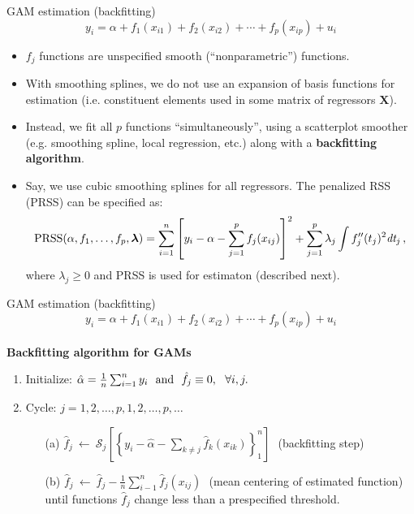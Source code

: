\documentclass{beamer}
\begin{document}
\begin{frame}{GAM estimation (backfitting)}
\vspace{-0.3cm}
$$ y_i = \alpha + f_1(x_{i1}) + f_2(x_{i2}) + \cdots + f_p(x_{ip}) + u_i$$
\vspace{-0.3cm}
\begin{itemize}
    \item $f_j$ functions are unspecified smooth (``nonparametric'') functions.
    \smallskip
    \item With smoothing splines, we do not use an expansion of basis functions for estimation (i.e. constituent elements used in some matrix of regressors $\bm{X}$).
    \smallskip
    \item Instead, we fit all $p$ functions ``simultaneously'', using a scatterplot smoother (e.g. smoothing spline, local regression, etc.) along with a \textbf{backfitting algorithm}.
    \smallskip
    \item Say, we use cubic smoothing splines for all regressors. The penalized RSS (PRSS) can be specified as:
    \small{$$\textnormal{PRSS}(\alpha,f_1,\dots,f_p,\bm{\lambda}) = \sum_{i=1}^n \left[y_i - \alpha - \sum_{j=1}^p f_j(x_{ij}) \right]^2 + \sum_{j=1}^p \lambda_j \int f_j''(t_j)^2 \textit{dt}_j\,,$$}
    where $\lambda_j \geq 0$ and PRSS is used for estimaton (described next).
\end{itemize}
\end{frame}
\begin{frame}{GAM estimation (backfitting)}
\vspace{-0.3cm}
$$ y_i = \alpha + f_1(x_{i1}) + f_2(x_{i2}) + \cdots + f_p(x_{ip}) + u_i$$\\
\bigskip
\textbf{Backfitting algorithm for GAMs}\\ \medskip
\begin{enumerate}
    \item Initialize: $\hat{\alpha}=\frac{1}{n} \sum_{i=1}^n y_i~~\textnormal{and}~~\hat{f}_j \equiv 0,~~\forall i,j.$
    \bigskip
    \item Cycle: $j = 1,2,\dots,p,1,2,\dots,p,\dots$
    \bigskip
    \begin{itemize}
        \item[(a)] $\hat{f}_j~\leftarrow ~ \mathcal{S}_j \left[ \left\lbrace y_i - \hat{\alpha} - \sum_{k \neq j} \hat{f}_k (x_{ik}) \right\rbrace_1^n \right]~~~$(backfitting step)
        \bigskip
        \item[(b)] $\hat{f}_j~\leftarrow ~ \hat{f}_j - \frac{1}{n} \sum_{i-1}^n \hat{f}_j (x_{ij}) ~~~$(mean centering of estimated function)\\
        \bigskip
        until functions $\hat{f}_j$ change less than a prespecified threshold.
    \end{itemize}
\end{enumerate}
\end{frame}
\end{document}
